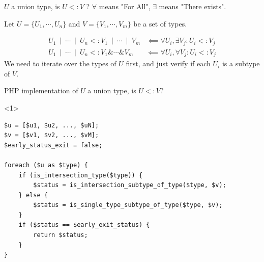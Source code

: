 \documentclass[aspectratio=169]{beamer}
\newcommand{\union}{\:\mathrel{|}\:}
\newcommand{\inter}{\mathrel{\&}}
\newcommand{\subtype}{\mathrel{<:}}
\begin{document}
\begin{frame}{$U$ a union type, is $U \subtype V$ ?}
    $\forall$ means "For All", $\exists$ means "There exists".

    Let $U = \{U_1, \cdots, U_n\}$ and $V = \{V_1, \cdots, V_m\}$ be a set of types.

    \begin{align}
        U_1\union\cdots\union U_n \subtype V_1\union\cdots\union V_m & \impliedby \forall U_i, \exists V_j : U_i \subtype V_j \\
        U_1\union\cdots\union U_n \subtype V_1\inter\cdots\inter V_m & \impliedby \forall U_i, \forall V_j : U_i \subtype V_j
    \end{align}
    We need to iterate over the types of $U$ first, and just verify if each $U_i$ is a subtype of $V$. 
\end{frame}
\begin{frame}[fragile]{PHP implementation of $U$ a union type, is $U \subtype V$?}
    \begin{onlyenv}<1>
        \begin{verbatim}
$u = [$u1, $u2, ..., $uN];
$v = [$v1, $v2, ..., $vM];
$early_status_exit = false;

foreach ($u as $type) {
    if (is_intersection_type($type)) {
        $status = is_intersection_subtype_of_type($type, $v);
    } else {
        $status = is_single_type_subtype_of_type($type, $v);
    }
    if ($status == $early_exit_status) {
        return $status;
    }
}
        \end{verbatim}
    \end{onlyenv}
\end{frame}
\end{document}
